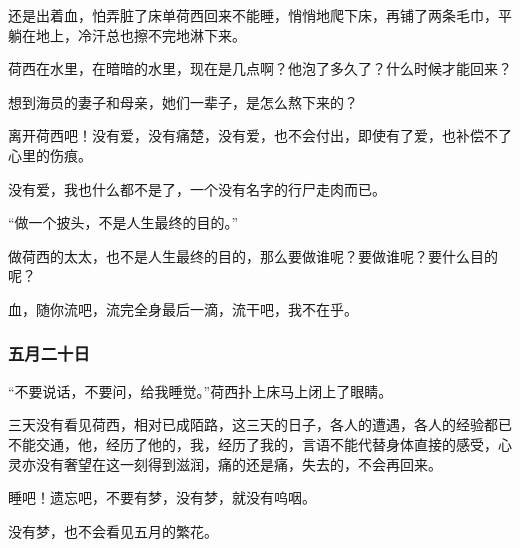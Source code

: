 \par 还是出着血，怕弄脏了床单荷西回来不能睡，悄悄地爬下床，再铺了两条毛巾，平躺在地上，冷汗总也擦不完地淋下来。
\par 荷西在水里，在暗暗的水里，现在是几点啊？他泡了多久了？什么时候才能回来？
\par 想到海员的妻子和母亲，她们一辈子，是怎么熬下来的？
\par 离开荷西吧！没有爱，没有痛楚，没有爱，也不会付出，即使有了爱，也补偿不了心里的伤痕。
\par 没有爱，我也什么都不是了，一个没有名字的行尸走肉而已。
\par “做一个披头，不是人生最终的目的。”
\par 做荷西的太太，也不是人生最终的目的，那么要做谁呢？要做谁呢？要什么目的呢？
\par 血，随你流吧，流完全身最后一滴，流干吧，我不在乎。

\subsubsection{五月二十日}
\par “不要说话，不要问，给我睡觉。”荷西扑上床马上闭上了眼睛。
\par 三天没有看见荷西，相对已成陌路，这三天的日子，各人的遭遇，各人的经验都已不能交通，他，经历了他的，我，经历了我的，言语不能代替身体直接的感受，心灵亦没有奢望在这一刻得到滋润，痛的还是痛，失去的，不会再回来。
\par 睡吧！遗忘吧，不要有梦，没有梦，就没有呜咽。
\par 没有梦，也不会看见五月的繁花。

